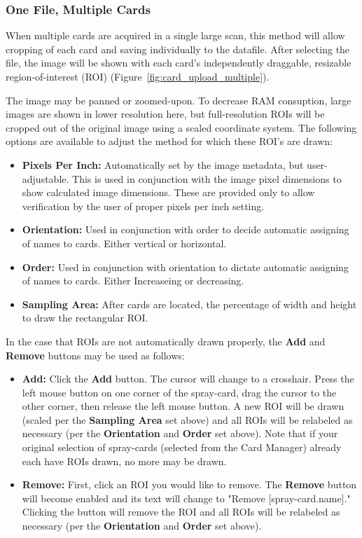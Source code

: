 \documentclass[10pt,letterpaper,titlepage]{article}
\begin{document}
    \subsubsection{One File, Multiple Cards}
    When multiple cards are acquired in a single large scan, this method will allow cropping of each card and saving individually to the datafile. After selecting the file, the image will be shown with each card's independently draggable, resizable region-of-interest (ROI) (Figure~\ref{fig:card_upload_multiple}).\par 
    The image may be panned or zoomed-upon. To decrease RAM consuption, large images are shown in lower resolution here, but full-resolution ROIs will be cropped out of the original image using a scaled coordinate system. The following options are available to adjust the method for which these ROI's are drawn:
    \begin{itemize}
        \item \textbf{Pixels Per Inch:} Automatically set by the image metadata, but user-adjustable. This is used in conjunction with the image pixel dimensions to show calculated image dimensions. These are provided only to allow verification by the user of proper pixels per inch setting.
        \item \textbf{Orientation:} Used in conjunction with order to decide automatic assigning of names to cards. Either vertical or horizontal.
        \item \textbf{Order:} Used in conjunction with orientation to dictate automatic assigning of names to cards. Either Increaseing or decreasing.
        \item \textbf{Sampling Area:} After cards are located, the percentage of width and height to draw the rectangular ROI.
    \end{itemize}
    In the case that ROIs are not automatically drawn properly, the \textbf{Add} and \textbf{Remove} buttons may be used as follows:
    \begin{itemize} 
        \item \textbf{Add:} Click the \textbf{Add} button. The cursor will change to a crosshair. Press the left mouse button on one corner of the spray-card, drag the cursor to the other corner, then release the left mouse button. A new ROI will be drawn (scaled per the \textbf{Sampling Area} set above) and all ROIs will be relabeled as necessary (per the \textbf{Orientation} and \textbf{Order} set above). Note that if your original selection of spray-cards (selected from the Card Manager) already each have ROIs drawn, no more may be drawn.
        \item \textbf{Remove:} First, click an ROI you would like to remove. The \textbf{Remove} button will become enabled and its text will change to "Remove [spray-card.name]." Clicking the button will remove the ROI and all ROIs will be relabeled as necessary (per the \textbf{Orientation} and \textbf{Order} set above).
    \end{itemize}
\end{document}
